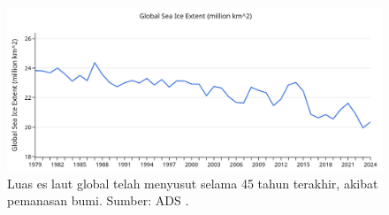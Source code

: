 \documentclass[10pt,twocolumn,letterpaper]{article}
\begin{document}
\begin{figure}[t]
\begin{center}
\includegraphics[width=1\textwidth]{ice.jpg}
\end{center}
   \caption{Luas es laut global telah menyusut selama 45 tahun terakhir, akibat pemanasan bumi. Sumber: ADS \cite{149}.}
\label{fig:24}
\end{figure}

\clearpage
\twocolumn

{\small
\renewcommand{\refname}{References}


}
\end{document}

